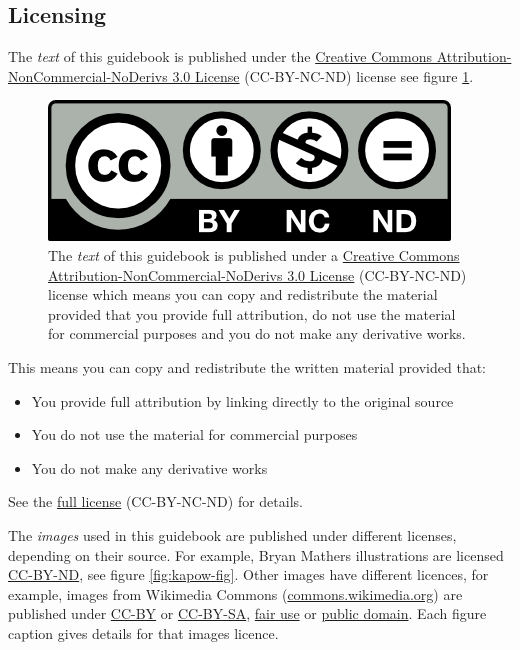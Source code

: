 \documentclass[
]{book}
\providecommand{\tightlist}{%
  \setlength{\itemsep}{0pt}\setlength{\parskip}{0pt}}
\begin{document}
\hypertarget{license}{%
\subsection{Licensing}\label{license}}

The \emph{text} of this guidebook is published under the \href{https://creativecommons.org/licenses/by-nc-nd/3.0/}{Creative Commons Attribution-NonCommercial-NoDerivs 3.0 License} (CC-BY-NC-ND) license see figure \ref{fig:cc-by-nc-nd-fig}.

\begin{figure}

{\centering \includegraphics[width=1\linewidth]{images/by-nc-nd} 

}

\caption{The \emph{text} of this guidebook is published under a \href{https://creativecommons.org/licenses/by-nc-nd/3.0/}{Creative Commons Attribution-NonCommercial-NoDerivs 3.0 License} (CC-BY-NC-ND) license which means you can copy and redistribute the material provided that you provide full attribution, do not use the material for commercial purposes and you do not make any derivative works.}\label{fig:cc-by-nc-nd-fig}
\end{figure}



This means you can copy and redistribute the written material provided that:

\begin{itemize}
\tightlist
\item
  You provide full attribution by linking directly to the original source
\item
  You do not use the material for commercial purposes
\item
  You do not make any derivative works
\end{itemize}

See the \href{https://creativecommons.org/licenses/by-nc-nd/3.0/}{full license} (CC-BY-NC-ND) for details.

The \emph{images} used in this guidebook are published under different licenses, depending on their source. For example, Bryan Mathers illustrations are licensed \href{https://creativecommons.org/licenses/by-nd/4.0/}{CC-BY-ND}, see figure \ref{fig:kapow-fig}. Other images have different licences, for example, images from Wikimedia Commons (\href{https://commons.wikimedia.org/}{commons.wikimedia.org}) are published under \href{https://creativecommons.org/licenses/by/2.0/}{CC-BY} or \href{https://creativecommons.org/licenses/by-sa/2.0/}{CC-BY-SA}, \href{https://en.wikipedia.org/wiki/Fair_use}{fair use} or \href{https://en.wikipedia.org/wiki/Public_domain}{public domain}. Each figure caption gives details for that images licence.
\end{document}
